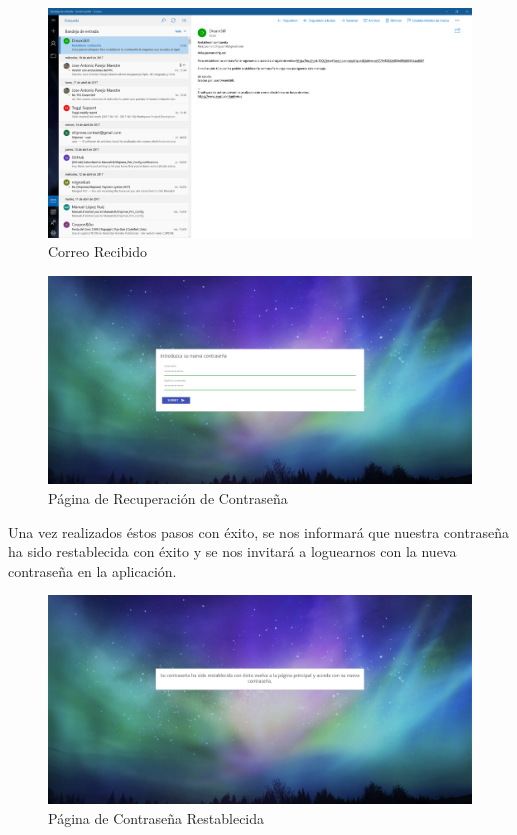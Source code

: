 \documentclass[11pt,openany]{book}
\begin{document}
\begin{figure}[H]
\centering
\includegraphics[totalheight=6cm]{manualUsuario/correoRecibido.png}
\caption{Correo Recibido}
\end{figure}

\begin{figure}[H]
\centering
\includegraphics[totalheight=6cm]{manualUsuario/contrase_aRecuperacion.png}
\caption{Página de Recuperación de Contraseña}
\end{figure}

\pagebreak
Una vez realizados éstos pasos con éxito, se nos informará que nuestra contraseña ha sido restablecida con éxito y se nos invitará a loguearnos con la nueva contraseña en la aplicación.

\begin{figure}[H]
\centering
\includegraphics[totalheight=6cm]{manualUsuario/contrase_aRestablecida.png}
\caption{Página de Contraseña Restablecida}
\end{figure}
\end{document}
